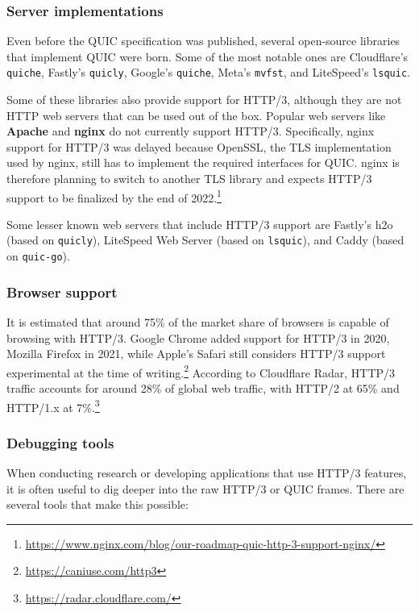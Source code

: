 \subsubsection{Server implementations}
\label{sec:bg/http3/servers}

Even before the QUIC specification was published, several open-source libraries that implement QUIC were born. Some of the most notable ones are Cloudflare's \texttt{quiche}, Fastly's \texttt{quicly}, Google's \texttt{quiche}, Meta's \texttt{mvfst}, and LiteSpeed's \texttt{lsquic}.\cite{quicdiversity}

Some of these libraries also provide support for HTTP/3, although they are not HTTP web servers that can be used out of the box. Popular web servers like \textbf{Apache} and \textbf{nginx} do not currently support HTTP/3. Specifically, nginx support for HTTP/3 was delayed because OpenSSL, the TLS implementation used by nginx, still has to implement the required interfaces for QUIC. nginx is therefore planning to switch to another TLS library and expects HTTP/3 support to be finalized by the end of 2022.\footnote{\url{https://www.nginx.com/blog/our-roadmap-quic-http-3-support-nginx/}}

Some lesser known web servers that include HTTP/3 support are Fastly's h2o (based on \texttt{quicly}), LiteSpeed Web Server (based on \texttt{lsquic}), and Caddy (based on \texttt{quic-go}).

\subsubsection{Browser support}
\label{sec:bg/http3/browsers}

It is estimated that around 75\% of the market share of browsers is capable of browsing with HTTP/3. Google Chrome added support for HTTP/3 in 2020, Mozilla Firefox in 2021, while Apple's Safari still considers HTTP/3 support experimental at the time of writing.\footnote{\url{https://caniuse.com/http3}} According to Cloudflare Radar, HTTP/3 traffic accounts for around 28\% of global web traffic, with HTTP/2 at 65\% and HTTP/1.x at 7\%.\footnote{\url{https://radar.cloudflare.com/}}

\subsubsection{Debugging tools}
\label{sec:bg/http3/tools}

When conducting research or developing applications that use HTTP/3 features, it is often useful to dig deeper into the raw HTTP/3 or QUIC frames. There are several tools that make this possible:

